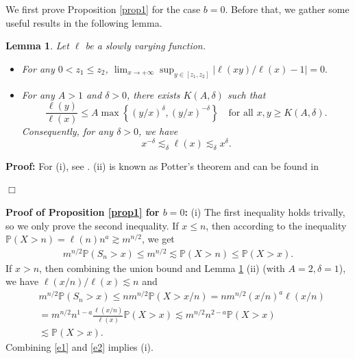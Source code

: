 \documentclass[11pt]{article}
\newtheorem{lemma}[thrm]{Lemma}
\numberwithin{equation}{section}
\begin{document}
	We first prove Proposition \ref{prop1} for the case $b = 0$. Before that, we gather some useful results in the following lemma.
	
	\begin{lemma}\label{lem-useful-fact}
		Let $\ell$ be a slowly varying function.
		
		\begin{itemize}
			\item[(i)] For any $0<z_1\leq z_2$, 
			$
			\lim_{x \to +\infty} \sup_{ y\in [z_1, z_2]} \big|  \ell(xy)/\ell(x) - 1\big| =0.
			$
			
			\item[(ii)] For any $A > 1$ and $\delta > 0$, there exists $K(A, \delta)$ such that
			\[
			\frac{\ell(y)}{\ell(x)} \leq A \max\left\{(y/x)^\delta, (y/x)^{-\delta}\right\} \quad \text{for all } x, y \geq K(A, \delta).
			\]
			Consequently, for any $\delta > 0$, we have
			\[
			x^{-\delta} \lesssim_\delta \ell(x) \lesssim_\delta x^{\delta}.
			\]
		\end{itemize}
	\end{lemma}
	\textbf{Proof: }  For (i), see \cite[Theorem 1.5.2, p.22]{BGT1987}. (ii) is known as Potter's theorem and can be found in \cite[Theorem 1.5.6, p.25]{BGT1987}
	
	
	\hfill$\Box$
	

\noindent
\textbf{Proof of Proposition \ref{prop1} for $b=0$:}  (i) The first inequality holds trivally, so we only prove the second inequality. 
If $x\leq n$, then according to the inequality $\mathbb{P}(X>n)= \ell(n)n^a\gtrsim m^{n/2}$, we get 
\begin{align}\label{e1}
	m^{n/2} \mathbb{P}\left(S_n>x\right)\leq m^{n/2}\lesssim   \mathbb{P}(X>n)\leq   \mathbb{P}(X>x). 
\end{align}
If $x>n$, then combining the union bound and Lemma \ref{lem-useful-fact} (ii) (with $A=2, \delta=1$),  we have $\ell(x/n)/\ell(x)\lesssim n$ and 
\begin{align} \label{e2}
	& m^{n/2}  \mathbb{P}\left(S_n> x \right)  \leq nm^{n/2}  \mathbb{P}(X>x/n) = nm^{n/2} (x/n)^a \ell(x/n) \nonumber\\
	&= m^{n/2} n^{1-a} \frac{\ell(x/n)}{\ell(x)} \mathbb{P}(X>x) \lesssim m^{n/2} n^{2-a} \mathbb{P}(X>x) \nonumber\\
	&\lesssim \mathbb{P}(X>x) .
\end{align}
Combining \eqref{e1} and \eqref{e2} implies (i).
\end{document}
